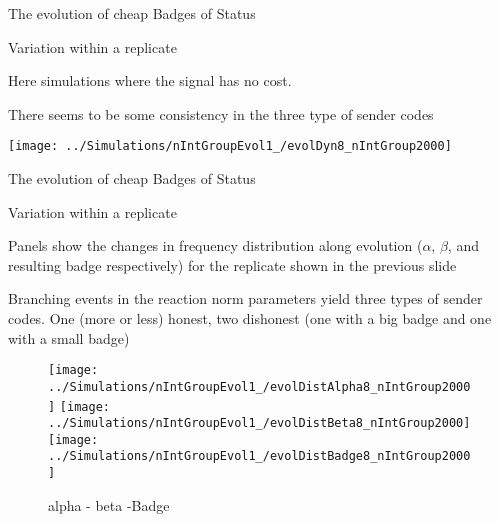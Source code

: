 \documentclass[
  ignorenonframetext,
]{beamer}
\begin{document}
\begin{frame}{The evolution of cheap Badges of Status}
\protect\hypertarget{the-evolution-of-cheap-badges-of-status-1}{}

\begin{block}{Variation within a replicate}

\small

Here simulations where the signal has no cost.

There seems to be some consistency in the three type of sender codes

\begin{center}\texttt{[image: ../Simulations/nIntGroupEvol1\_/evolDyn8\_nIntGroup2000]} \end{center}

\end{block}

\end{frame}

\begin{frame}{The evolution of cheap Badges of Status}
\protect\hypertarget{the-evolution-of-cheap-badges-of-status-2}{}

\begin{block}{Variation within a replicate}

\tiny

Panels show the changes in frequency distribution along evolution
(\(\alpha\), \(\beta\), and resulting badge respectively) for the
replicate shown in the previous slide

Branching events in the reaction norm parameters yield three types of
sender codes. One (more or less) honest, two dishonest (one with a big
badge and one with a small badge)

\begin{figure}

\texttt{[image: ../Simulations/nIntGroupEvol1\_/evolDistAlpha8\_nIntGroup2000]} \texttt{[image: ../Simulations/nIntGroupEvol1\_/evolDistBeta8\_nIntGroup2000]} \texttt{[image: ../Simulations/nIntGroupEvol1\_/evolDistBadge8\_nIntGroup2000]} \hfill{}

\caption{alpha - beta -Badge}\label{fig:unnamed-chunk-22}
\end{figure}

\end{block}

\end{frame}
\end{document}
